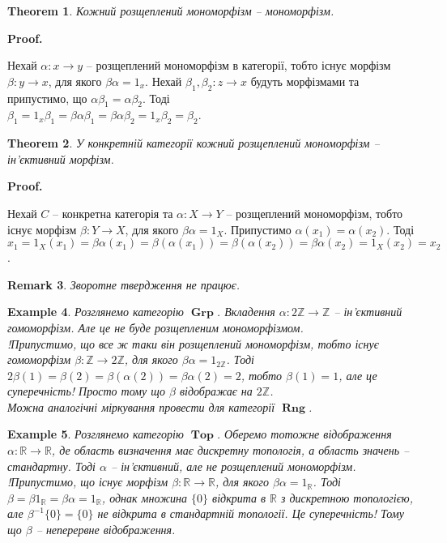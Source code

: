 \documentclass[a4paper, 10pt]{article}
\makeatletter
\theoremstyle{theoremdd}
\newtheorem{theorem}{Theorem}[subsection]
\newtheorem{example}[theorem]{Example}
\newtheorem{remark}[theorem]{Remark}
\renewenvironment{proof}[1][Proof.\\]{\par
\pushQED{\hfill \qed}%
\normalfont \topsep6\p@\@plus6\p@\relax
\trivlist
\item\relax
{\bfseries
#1\@addpunct{.}}\hspace\labelsep\ignorespaces
}{%
\popQED\endtrivlist\@endpefalse
}
\DeclareMathOperator{\Grp}{\textbf{Grp}}
\DeclareMathOperator{\Rng}{\textbf{Rng}}
\DeclareMathOperator{\Top}{\textbf{Top}}
\makeatother
\begin{document}
\begin{theorem}
Кожний розщеплений мономорфізм -- мономорфізм.
\end{theorem}

\begin{proof}
Нехай $\alpha \colon x \to y$ -- розщеплений мономорфізм в категорії, тобто існує морфізм $\beta \colon y \to x$, для якого $\beta \alpha = 1_x$. Нехай $\beta_1,\beta_2 \colon z \to x$ будуть морфізмами та припустимо, що $\alpha \beta_1 = \alpha \beta_2$. Тоді \\
$\beta_1 = 1_x \beta_1 = \beta \alpha \beta_1 = \beta \alpha \beta_2 = 1_x \beta_2 = \beta_2$.
\end{proof}

\begin{theorem}
У конкретній категорії кожний розщеплений мономорфізм -- ін'єктивний морфізм.
\end{theorem}

\begin{proof}
Нехай $C$ -- конкретна категорія та $\alpha \colon X \to Y$ -- розщеплений мономорфізм, тобто існує морфізм $\beta \colon Y \to X$, для якого $\beta \alpha = 1_X$. Припустимо $\alpha(x_1) = \alpha(x_2)$. Тоді\\
$x_1 = 1_X (x_1) = \beta \alpha(x_1) = \beta(\alpha(x_1)) = \beta(\alpha(x_2)) = \beta \alpha(x_2) = 1_X(x_2) = x_2$.
\end{proof}

\begin{remark}
Зворотне твердження не працює.
\end{remark}

\begin{example}
Розглянемо категорію $\Grp$. Вкладення $\alpha \colon 2 \mathbb{Z} \to \mathbb{Z}$ -- ін'єктивний гомоморфізм. Але це не буде розщепленим мономорфізмом.\\
!Припустимо, що все ж таки він розщеплений мономорфізм, тобто існує гомоморфізм $\beta \colon \mathbb{Z} \to 2 \mathbb{Z}$, для якого $\beta \alpha = 1_{2 \mathbb{Z}}$. Тоді $2 \beta(1) = \beta(2) = \beta(\alpha(2)) = \beta \alpha(2) = 2$, тобто $\beta(1) = 1$, але це суперечність! Просто тому що $\beta$ відображає на $2 \mathbb{Z}$.
\bigskip \\
Можна аналогічні міркування провести для категорії $\Rng$.
\end{example}

\begin{example}
Розглянемо категорію $\Top$. Оберемо тотожне відображення $\alpha \colon \mathbb{R} \to \mathbb{R}$, де область визначення має дискретну топологія, а область значень -- стандартну. Тоді $\alpha$ -- ін'єктивний, але не розщеплений мономорфізм.\\
!Припустимо, що існує морфізм $\beta \colon \mathbb{R} \to \mathbb{R}$, для якого $\beta \alpha = 1_\mathbb{R}$. Тоді $\beta = \beta 1_{\mathbb{R}} = \beta \alpha = 1_{\mathbb{R}}$, однак множина $\{0\}$ відкрита в $\mathbb{R}$ з дискретною топологією, але $\beta^{-1}\{0\} = \{0\}$ не відкрита в стандартній топології. Це суперечність! Тому що $\beta$ -- неперервне відображення.
\end{example}
\end{document}
